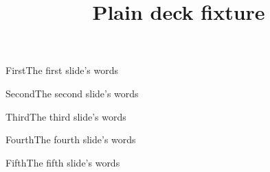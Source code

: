 \documentclass{beamer}
\title{Plain deck fixture}
\begin{document}
\begin{frame}{First}The first slide's words\end{frame}
\begin{frame}{Second}The second slide's words\end{frame}
\begin{frame}{Third}The third slide's words\end{frame}
\begin{frame}{Fourth}The fourth slide's words\end{frame}
\begin{frame}{Fifth}The fifth slide's words\end{frame}
\end{document}
